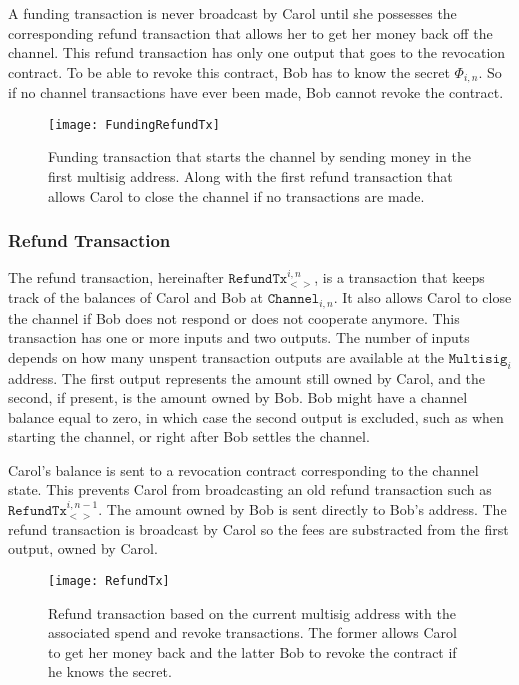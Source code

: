 \documentclass{llncs}
\begin{document}
A funding transaction is never broadcast by Carol until she possesses the
corresponding refund transaction that allows her to get her money back off the
channel. This refund transaction has only one output that goes to the revocation
contract. To be able to revoke this contract, Bob has to know the secret
$\Phi_{i,n}$. So if no channel transactions have ever been made, Bob cannot
revoke the contract.

\begin{figure}[t]
  \centering \texttt{[image: FundingRefundTx]}
  \caption{Funding transaction that starts the channel by sending money in the
first multisig address. Along with the first refund transaction that allows
Carol to close the channel if no transactions are made.}
\end{figure}

\subsubsection{Refund Transaction} The refund transaction, hereinafter
$\texttt{RefundTx}_{<>}^{i,n}$, is a transaction that keeps track of the
balances of Carol and Bob at $\texttt{Channel}_{i,n}$. It also allows Carol to
close the channel if Bob does not respond or does not cooperate anymore. This
transaction has one or more inputs and two outputs. The number of inputs depends
on how many unspent transaction outputs are available at the
$\texttt{Multisig}_i$ address. The first output represents the amount still
owned by Carol, and the second, if present, is the amount owned by Bob. Bob
might have a channel balance equal to zero, in which case the second output is
excluded, such as when starting the channel, or right after Bob settles the
channel.

Carol's balance is sent to a revocation contract corresponding to the channel
state. This prevents Carol from broadcasting an old refund transaction such as
$\texttt{RefundTx}_{<>}^{i,n-1}$. The amount owned by Bob is sent directly to
Bob's address. The refund transaction is broadcast by Carol so the fees are
substracted from the first output, owned by Carol.

\begin{figure}[t] \centering \texttt{[image: RefundTx]}
  \caption{Refund transaction based on the current multisig address with the
associated spend and revoke transactions. The former allows Carol to get her
money back and the latter Bob to revoke the contract if he knows the secret.}
\end{figure}
\end{document}
